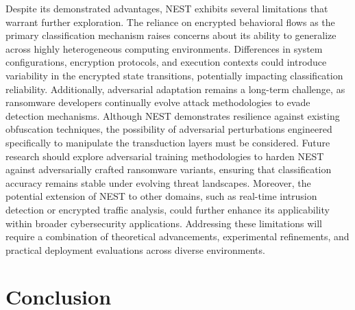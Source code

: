 \documentclass[lettersize,journal]{IEEEtran}
\begin{document}
Despite its demonstrated advantages, NEST exhibits several limitations that warrant further exploration. The reliance on encrypted behavioral flows as the primary classification mechanism raises concerns about its ability to generalize across highly heterogeneous computing environments. Differences in system configurations, encryption protocols, and execution contexts could introduce variability in the encrypted state transitions, potentially impacting classification reliability. Additionally, adversarial adaptation remains a long-term challenge, as ransomware developers continually evolve attack methodologies to evade detection mechanisms. Although NEST demonstrates resilience against existing obfuscation techniques, the possibility of adversarial perturbations engineered specifically to manipulate the transduction layers must be considered. Future research should explore adversarial training methodologies to harden NEST against adversarially crafted ransomware variants, ensuring that classification accuracy remains stable under evolving threat landscapes. Moreover, the potential extension of NEST to other domains, such as real-time intrusion detection or encrypted traffic analysis, could further enhance its applicability within broader cybersecurity applications. Addressing these limitations will require a combination of theoretical advancements, experimental refinements, and practical deployment evaluations across diverse environments.




\section{Conclusion}
\end{document}
